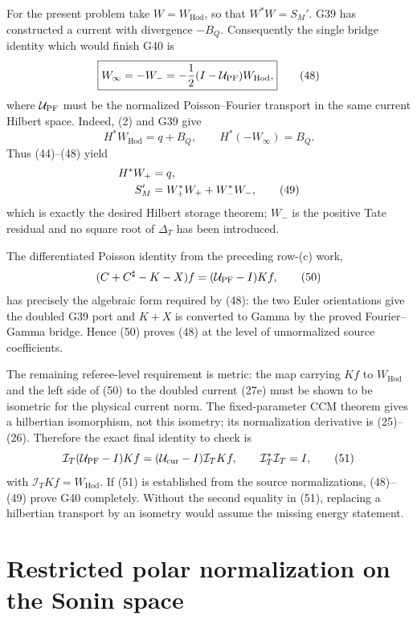 \documentclass[11pt]{article}
\newcommand{\Hod}{\mathrm{Hod}}
\begin{document}
For the present problem take $W=W_{\Hod}$, so that $W^*W=S_M'$.  G39 has
constructed a current with divergence $-B_Q$.  Consequently the single bridge
identity which would finish G40 is
\begin{equation}
 \boxed{
 W_\infty=-W_-
 =-\frac12(I-\mathcal U_{\rm PF})W_{\Hod},}             \tag{48}
\end{equation}
where $\mathcal U_{\rm PF}$ must be the normalized Poisson--Fourier transport
in the same current Hilbert space.  Indeed, (2) and G39 give
\[
 H^*W_{\Hod}=q+B_Q,\qquad H^*(-W_\infty)=B_Q.
\]
Thus (44)--(48) yield
\begin{align}
 H^*W_+&=q,\notag\\
 S_M'&=W_+^*W_++W_-^*W_-,                              \tag{49}
\end{align}
which is exactly the desired Hilbert storage theorem; $W_-$ is the positive
Tate residual and no square root of $\Delta_T$ has been introduced.

The differentiated Poisson identity from the preceding row-(c) work,
\begin{equation}
 (C+C^\sharp-K-X)f=(\mathcal U_{\rm PF}-I)Kf,           \tag{50}
\end{equation}
has precisely the algebraic form required by (48): the two Euler orientations
give the doubled G39 port and $K+X$ is converted to Gamma by the proved
Fourier--Gamma bridge.  Hence (50) proves (48) at the level of unnormalized
source coefficients.

The remaining referee-level requirement is metric: the map carrying $Kf$ to
$W_{\Hod}$ and the left side of (50) to the doubled current (27e) must be shown
to be isometric for the physical current norm.  The fixed-parameter CCM
theorem gives a hilbertian isomorphism, not this isometry; its normalization
derivative is (25)--(26).  Therefore the exact final identity to check is
\begin{equation}
 \mathcal I_T(\mathcal U_{\rm PF}-I)Kf
 =(\mathcal U_{\rm cur}-I)\mathcal I_TKf,\qquad
 \mathcal I_T^*\mathcal I_T=I,                          \tag{51}
\end{equation}
with $\mathcal I_TKf=W_{\Hod}$.  If (51) is established from the source
normalizations, (48)--(49) prove G40 completely.  Without the second equality
in (51), replacing a hilbertian transport by an isometry would assume the
missing energy statement.

\section{Restricted polar normalization on the Sonin space}
\end{document}
